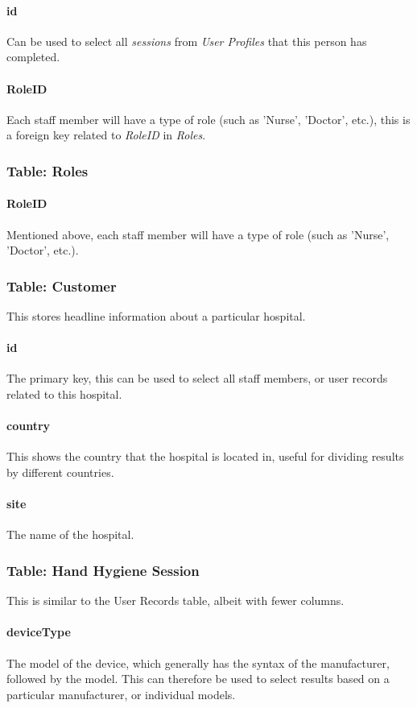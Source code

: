             \paragraph{id} Can be used to select all {\slshape sessions} from {\slshape User Profiles} that this person has completed.
            \paragraph{RoleID} Each staff member will have a type of role (such as 'Nurse', 'Doctor', etc.), this is a foreign key related to {\slshape RoleID} in {\slshape Roles}.
        \subsubsection{Table: Roles}
            \paragraph{RoleID} Mentioned above, each staff member will have a type of role (such as 'Nurse', 'Doctor', etc.).
        \subsubsection{Table: Customer} This stores headline information about a particular hospital.
            \paragraph{id} The primary key, this can be used to select all staff members, or user records related to this hospital.
            \paragraph{country} This shows the country that the hospital is located in, useful for dividing results by different countries.
            \paragraph{site} The name of the hospital.
        \subsubsection{Table: Hand Hygiene Session} This is similar to the User Records table, albeit with fewer columns.
            \paragraph{deviceType} The model of the device, which generally has the syntax of the manufacturer, followed by the model. This can therefore be used to select results based on a particular manufacturer, or individual models.
